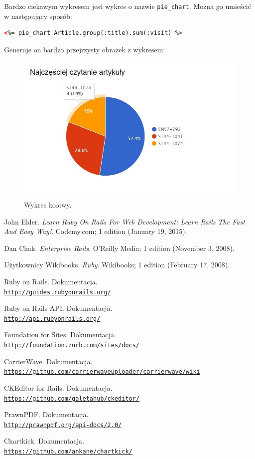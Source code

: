 \documentclass[openright]{xmgr}
\begin{document}
Bardzo ciekawym wykresem jest wykres o nazwie \texttt{pie\_chart}. Można go umieścić w następujący sposób:
\begin{lstlisting}[language=html, caption={Kod uruchamiający wykres kołowy}]
<%= pie_chart Article.group(:title).sum(:visit) %>
\end{lstlisting}
Generuje on bardzo przejrzysty obrazek z wykresem:
\begin{figure}[!tbh]
\centering
\includegraphics[width=.5\linewidth]{fig/chartkick}
\caption{Wykres kołowy.\label{RYS.6}}
\end{figure}

\begin{thebibliography}{9}
John Elder.
\textit{Learn Ruby On Rails For Web Development: Learn Rails The Fast And Easy Way!}. 
Codemy.com; 1 edition (January 19, 2015).
 
Dan Chak.
\textit{Enterprise Rails}. 
O'Reilly Media; 1 edition (November 3, 2008).

Użytkownicy Wikibooks.
\textit{Ruby}. 
Wikibooks; 1 edition (February 17, 2008).

Ruby on Rails. Dokumentacja.
\\\texttt{\url{http://guides.rubyonrails.org/}}

Ruby on Rails API. Dokumentacja.
\\\texttt{\url{http://api.rubyonrails.org/}}

Foundation for Sites. Dokumentacja.
\\\texttt{\url{http://foundation.zurb.com/sites/docs/}}

CarrierWave. Dokumentacja.
\\\texttt{\url{https://github.com/carrierwaveuploader/carrierwave/wiki}}

CKEditor for Rails. Dokumentacja.
\\\texttt{\url{https://github.com/galetahub/ckeditor/}}

PrawnPDF. Dokumentacja.
\\\texttt{\url{http://prawnpdf.org/api-docs/2.0/}}

Chartkick. Dokumentacja.
\\\texttt{\url{https://github.com/ankane/chartkick/}}
\end{thebibliography}
\end{document}
